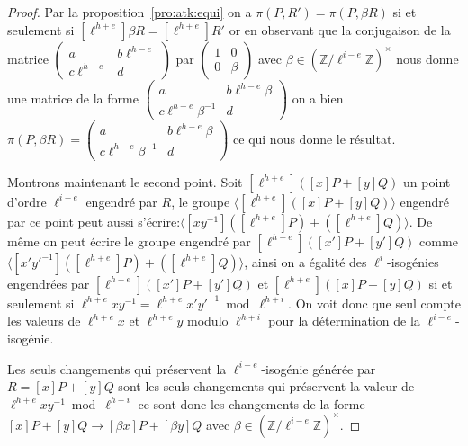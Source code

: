 \documentclass[10pt,a4paper]{book}
\theoremstyle{plain}
\theoremstyle{definition}
\theoremstyle{definition}
\theoremstyle{definition}
\theoremstyle{definition}
\theoremstyle{remark}
\theoremstyle{remark}
\theoremstyle{definition}
\begin{document}
\begin{proof}
Par la proposition~\ref{pro:atk:equi} on a $\pi(P,R')=\pi(P,
\beta R)$ si et seulement si $[\ell^{h+e}]\beta R=[\ell^{h+e}]R'$ or en 
observant que la conjugaison de la matrice $\left( \begin{smallmatrix}a & b 
\ell^{h-e} \\c  \ell^{h-e} & d \end{smallmatrix} \right)$ par $\left( 
\begin{smallmatrix}1 & 0 \\0 & \beta \end{smallmatrix} \right)$ avec $\beta \in
\left( \mathbb{Z}/\ell^{i-e} \mathbb{Z}\right)^{\times}$ nous donne une matrice de la 
forme $\left( \begin{smallmatrix}a & b \ell^{h-e} \beta \\c \ell^{h-e} \beta^{-1} &
 d \end{smallmatrix} \right)$ on a bien $\pi(P,\beta R)=\left( 
\begin{smallmatrix}a & b \ell^{h-e} \beta \\c \ell^{h-e} \beta^{-1} & d 
\end{smallmatrix} \right)$ ce qui nous donne le résultat.

Montrons maintenant le second point. Soit $[\ell^{h+e}]([x]P+[y]Q)$ un point 
d'ordre $\ell^{i-e}$ engendré par $R$, 
le groupe $\langle [\ell^{h+e}]([x]P+[y]Q) \rangle$ engendré par ce point peut 
aussi s'écrire:$\langle [xy^{-1}]([\ell^{h+e}]P)+ ([\ell^{h+e}]Q) \rangle$. De 
même on peut écrire le groupe engendré par $[\ell^{h+e}]([x']P+[y']Q)$ comme 
$\langle [x'y'^{-1}]([\ell^{h+e}]P)+ ([\ell^{h+e}]Q) \rangle$, ainsi on a 
égalité des $\ell^i$-isogénies engendrées par $[\ell^{h+e}]([x']P+[y']Q)$ et 
$[\ell^{h+e}]([x]P+[y]Q)$ si et seulement si $\ell^{h+e}xy^{-1}=\ell^{h+e}
x'y'^{-1}\bmod \ell^{h+i}$. On voit donc que seul compte les valeurs de 
$\ell^{h+e}x$ et $\ell^{h+e}y$ modulo $\ell^{h+i}$ pour la détermination de la 
$\ell^{i-e}$-isogénie.

Les seuls changements qui préservent la $\ell^{i-e}$-isogénie générée par 
$R=[x]P+[y]Q$ sont les seuls changements qui préservent la valeur de 
$\ell^{h+e}xy^{-1} \bmod \ell^{h+i}$ ce sont donc les changements de la forme 
$[x]P+[y]Q \rightarrow [\beta x]P+[\beta y]Q$ avec $\beta \in \left( \mathbb{Z}
/\ell^{i-e}\mathbb{Z} \right)^{\times}$. 
\end{proof}
\end{document}
